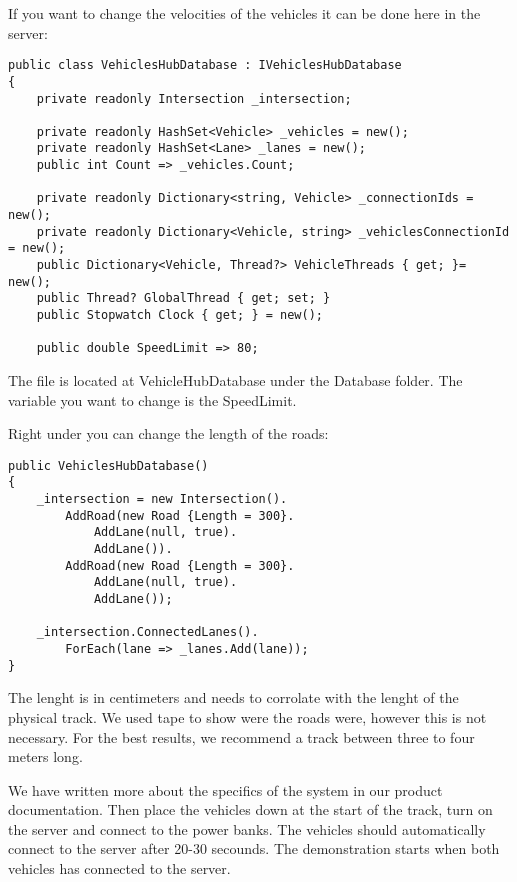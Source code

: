 If you want to change the velocities of the vehicles it can be done here in the server:
\begin{lstlisting}
public class VehiclesHubDatabase : IVehiclesHubDatabase
{
	private readonly Intersection _intersection;
	
	private readonly HashSet<Vehicle> _vehicles = new();
	private readonly HashSet<Lane> _lanes = new();
	public int Count => _vehicles.Count;
	
	private readonly Dictionary<string, Vehicle> _connectionIds = new();
	private readonly Dictionary<Vehicle, string> _vehiclesConnectionId = new();
	public Dictionary<Vehicle, Thread?> VehicleThreads { get; }= new();
	public Thread? GlobalThread { get; set; }
	public Stopwatch Clock { get; } = new();
	
	public double SpeedLimit => 80;
\end{lstlisting}

The file is located at VehicleHubDatabase under the Database folder. The variable you want to change is the SpeedLimit.

Right under you can change the length of the roads:
\begin{lstlisting}
public VehiclesHubDatabase()
{
	_intersection = new Intersection().
		AddRoad(new Road {Length = 300}.
			AddLane(null, true).
			AddLane()).
		AddRoad(new Road {Length = 300}.
			AddLane(null, true).
			AddLane());
	
	_intersection.ConnectedLanes().
		ForEach(lane => _lanes.Add(lane));
}
\end{lstlisting}

The lenght is in centimeters and needs to corrolate with the lenght of the physical track. We used tape to show were the roads were, however this is not necessary. For the best results, we recommend a track between three to four meters long.

We have written more about the specifics of the system in our product documentation.
Then place the vehicles down at the start of the track, turn on the server and connect to the power banks. The vehicles should automatically connect to the server after 20-30 secounds. The demonstration starts when both vehicles has connected to the server.
